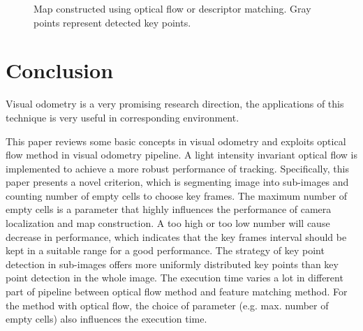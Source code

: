 \documentclass[11pt]{easychair}
\begin{document}
\begin{figure}[h!]
{\begin{minipage}[t]{0.49\textwidth}
\end{minipage}
}
\caption{Map constructed using optical flow or descriptor matching. Gray points represent detected key points.}
\end{figure}


\section{Conclusion}
Visual odometry is a very promising research direction, the applications of this technique is very useful in corresponding environment.

This paper reviews some basic concepts in visual odometry and exploits optical flow method in visual odometry pipeline. A light intensity invariant optical flow is implemented to achieve a more robust performance of tracking. Specifically, this paper presents a novel criterion, which is segmenting image into sub-images and counting number of empty cells to choose key frames. The maximum number of empty cells is a parameter that highly influences the performance of camera localization and map construction. A too high or too low number will cause decrease in performance, which indicates that the key frames interval should be kept in a suitable range for a good performance. The strategy of key point detection in sub-images offers more uniformly distributed key points than key point detection in the whole image. The execution time varies a lot in different part of pipeline between optical flow method and feature matching method. For the method with optical flow, the choice of parameter (e.g. max. number of empty cells) also influences the execution time.
\end{document}
